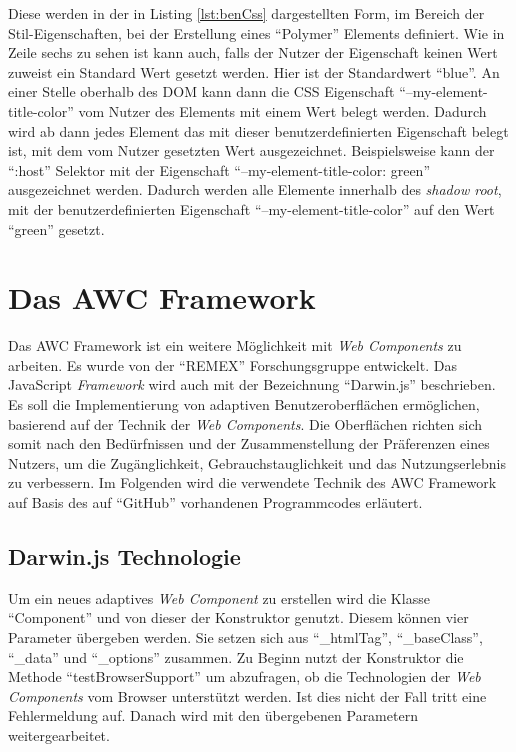 \documentclass[12pt, paper=a4, bibtotoc, toc=listof, headsepline=true]{scrreprt}
\begin{document}
Diese werden in der in Listing \ref{lst:benCss} dargestellten Form, im Bereich der Stil-Eigenschaften, bei der Erstellung eines \enquote{Polymer} Elements definiert. Wie in Zeile sechs zu sehen ist kann auch, falls der Nutzer der Eigenschaft keinen Wert zuweist ein Standard Wert gesetzt werden. Hier ist der Standardwert \enquote{blue}. An einer Stelle oberhalb des \ac{DOM} kann dann die \ac{CSS} Eigenschaft \enquote{--my-element-title-color} vom Nutzer des Elements mit einem Wert belegt werden. Dadurch wird ab dann jedes Element das mit dieser benutzerdefinierten Eigenschaft belegt ist, mit dem vom Nutzer gesetzten Wert ausgezeichnet. Beispielsweise kann der \enquote{:host} Selektor mit der Eigenschaft \enquote{--my-element-title-color: green} ausgezeichnet werden. Dadurch werden alle Elemente innerhalb des \emph{shadow root}, mit der benutzerdefinierten Eigenschaft \enquote{--my-element-title-color} auf den Wert \enquote{green} gesetzt.
\chapter{Das AWC Framework}	
Das \ac{AWC Framework} ist ein weitere Möglichkeit mit \emph{Web Components} zu arbeiten. Es wurde von der \enquote{REMEX} Forschungsgruppe entwickelt. Das JavaScript \emph{Framework} wird auch mit der Bezeichnung \enquote{Darwin.js} beschrieben. Es soll die Implementierung von adaptiven Benutzeroberflächen ermöglichen, basierend auf der Technik der \emph{Web Components}. Die Oberflächen richten sich somit nach den Bedürfnissen und der Zusammenstellung der Präferenzen eines Nutzers, um die Zugänglichkeit, Gebrauchstauglichkeit und das Nutzungserlebnis zu verbessern\cite{darwin}. Im Folgenden wird die verwendete Technik des \ac{AWC Framework} auf Basis des auf \enquote{GitHub} vorhandenen Programmcodes erläutert\cite{gitHubAwc}. 
\section{Darwin.js Technologie}
Um ein neues adaptives \emph{Web Component} zu erstellen wird die Klasse \enquote{Component} und von dieser der Konstruktor genutzt. Diesem können vier Parameter übergeben werden. Sie setzen sich aus \enquote{\_htmlTag}, \enquote{\_baseClass}, \enquote{\_data} und \enquote{\_options} zusammen. Zu Beginn nutzt der Konstruktor die Methode \enquote{testBrowserSupport} um abzufragen, ob die Technologien der \emph{Web Components} vom Browser unterstützt werden. Ist dies nicht der Fall tritt eine Fehlermeldung auf. Danach wird mit den übergebenen Parametern weitergearbeitet.
\end{document}
